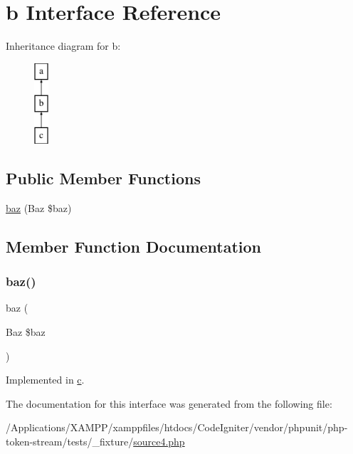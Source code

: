 \hypertarget{interfaceb}{}\section{b Interface Reference}
\label{interfaceb}
Inheritance diagram for b\+:\begin{figure}[H]
\begin{center}
\leavevmode
\includegraphics[height=3.000000cm]{interfaceb}
\end{center}
\end{figure}
\subsection*{Public Member Functions}
\begin{DoxyCompactItemize}
\item 
\mbox{\hyperlink{interfaceb_a9ee3f93f7e7aaa109f0f7f5abab35acc}{baz}} (Baz \$baz)
\end{DoxyCompactItemize}


\subsection{Member Function Documentation}
\mbox{\label{interfaceb_a9ee3f93f7e7aaa109f0f7f5abab35acc}} 
\subsubsection{\texorpdfstring{baz()}{baz()}}
{\footnotesize\ttfamily baz (\begin{DoxyParamCaption}\item[{Baz}]{\$baz }\end{DoxyParamCaption})}



Implemented in \mbox{\hyperlink{classc_a9ee3f93f7e7aaa109f0f7f5abab35acc}{c}}.



The documentation for this interface was generated from the following file\+:\begin{DoxyCompactItemize}
\item 
/\+Applications/\+X\+A\+M\+P\+P/xamppfiles/htdocs/\+Code\+Igniter/vendor/phpunit/php-\/token-\/stream/tests/\+\_\+fixture/\mbox{\hyperlink{source4_8php}{source4.\+php}}\end{DoxyCompactItemize}
